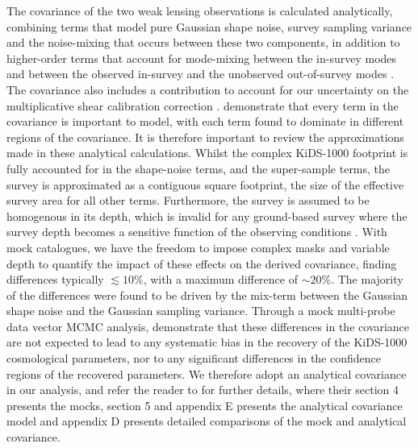 The covariance of the two weak lensing observations is calculated analytically, combining terms that model pure Gaussian shape noise, survey sampling variance and the noise-mixing that occurs between these two components, in addition to higher-order terms that account for mode-mixing between the in-survey modes and between the observed in-survey and the unobserved out-of-survey modes \citep[known as super-sample covariance,][]{takada/hu:2013}.   The covariance also includes a contribution to account for our uncertainty on the multiplicative shear calibration correction \citep{kannawadi/etal:2019}.  \citet{joachimi/etal:inprep} demonstrate that every term in the covariance is important to model, with each term found to dominate in different regions of the covariance.   It is therefore important to review the approximations made in these analytical calculations.    Whilst the complex KiDS-1000 footprint is fully accounted for in the shape-noise terms, and the super-sample terms,  the survey is approximated as a contiguous square footprint, the size of the effective survey area for all other terms.   Furthermore, the survey is assumed to be homogenous in its depth, which is invalid for any ground-based survey where the survey depth becomes a sensitive function of the observing conditions \citep{heydenreich/etal:2020}.   With mock catalogues, we have the freedom to impose complex masks and variable depth to quantify the impact of these effects on the derived covariance, finding differences typically $\lesssim 10\%$, with a maximum difference of $\sim 20 \%$.  The majority of the differences were found to be driven by the mix-term between the Gaussian shape noise and the Gaussian sampling variance.    Through a mock multi-probe data vector MCMC analysis, \citet{joachimi/etal:inprep} demonstrate that these differences in the covariance are not expected to lead to any systematic bias in the recovery of the KiDS-1000 cosmological parameters, nor to any significant differences in the confidence regions of the recovered parameters.   We therefore adopt an analytical covariance in our analysis,  and refer the reader to \citet{joachimi/etal:inprep} for further details, where their section 4 presents the mocks, section 5 and appendix E presents the analytical covariance model and appendix D presents detailed comparisons of the mock and analytical covariance.


